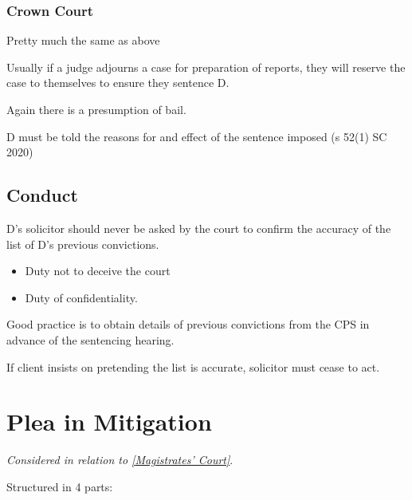 \documentclass[
]{article}
\newenvironment{Shaded}{}{}
\newcommand{\NormalTok}[1]{#1}
\providecommand{\tightlist}{%
  \setlength{\itemsep}{0pt}\setlength{\parskip}{0pt}}
\begin{document}
\hypertarget{crown-court}{%
\subsubsection{Crown Court}\label{crown-court}}

Pretty much the same as above

Usually if a judge adjourns a case for preparation of reports, they will
reserve the case to themselves to ensure they sentence D.

Again there is a presumption of bail.

\begin{Shaded}
\begin{Highlighting}[]
\NormalTok{D must be told the reasons for and effect of the sentence imposed (s 52(1) SC 2020)}
\end{Highlighting}
\end{Shaded}

\hypertarget{conduct-1}{%
\subsection{Conduct}\label{conduct-1}}

D's solicitor should never be asked by the court to confirm the accuracy
of the list of D's previous convictions.

\begin{itemize}
\tightlist
\item
  Duty not to deceive the court
\item
  Duty of confidentiality.
\end{itemize}

Good practice is to obtain details of previous convictions from the CPS
in advance of the sentencing hearing.

If client insists on pretending the list is accurate, solicitor must
cease to act.

\hypertarget{plea-in-mitigation}{%
\section{Plea in Mitigation}\label{plea-in-mitigation}}

\emph{Considered in relation to
\href{maximum\%20compensation\%20of\%20£5,000\%20per\%20offence}{{[}Magistrates'
Court{]}}}.

Structured in 4 parts:
\end{document}
